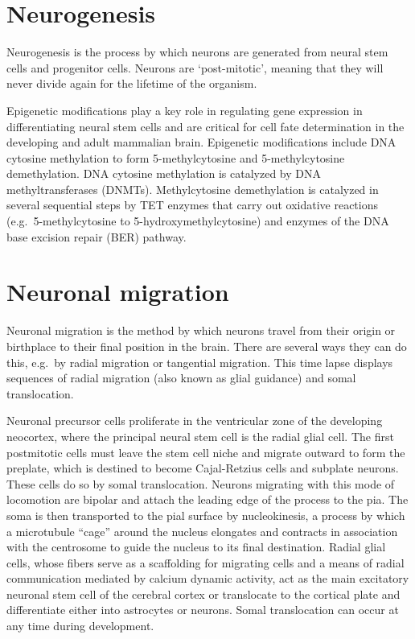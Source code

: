 \hypertarget{neurogenesis}{%
\section{Neurogenesis}\label{neurogenesis}}

Neurogenesis is the process by which neurons are generated from neural stem cells and progenitor cells. Neurons are `post-mitotic', meaning that they will never divide again for the lifetime of the organism.

Epigenetic modifications play a key role in regulating gene expression in differentiating neural stem cells and are critical for cell fate determination in the developing and adult mammalian brain. Epigenetic modifications include DNA cytosine methylation to form 5-methylcytosine and 5-methylcytosine demethylation. DNA cytosine methylation is catalyzed by DNA methyltransferases (DNMTs). Methylcytosine demethylation is catalyzed in several sequential steps by TET enzymes that carry out oxidative reactions (e.g.~5-methylcytosine to 5-hydroxymethylcytosine) and enzymes of the DNA base excision repair (BER) pathway.

\hypertarget{neuronal-migration}{%
\section{Neuronal migration}\label{neuronal-migration}}

Neuronal migration is the method by which neurons travel from their origin or birthplace to their final position in the brain. There are several ways they can do this, e.g.~by radial migration or tangential migration. This time lapse displays sequences of radial migration (also known as glial guidance) and somal translocation.

Neuronal precursor cells proliferate in the ventricular zone of the developing neocortex, where the principal neural stem cell is the radial glial cell. The first postmitotic cells must leave the stem cell niche and migrate outward to form the preplate, which is destined to become Cajal-Retzius cells and subplate neurons. These cells do so by somal translocation. Neurons migrating with this mode of locomotion are bipolar and attach the leading edge of the process to the pia. The soma is then transported to the pial surface by nucleokinesis, a process by which a microtubule ``cage'' around the nucleus elongates and contracts in association with the centrosome to guide the nucleus to its final destination. Radial glial cells, whose fibers serve as a scaffolding for migrating cells and a means of radial communication mediated by calcium dynamic activity, act as the main excitatory neuronal stem cell of the cerebral cortex or translocate to the cortical plate and differentiate either into astrocytes or neurons. Somal translocation can occur at any time during development.


